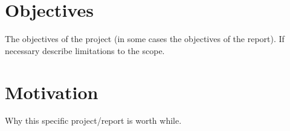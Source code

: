 
\section{Objectives}

The objectives of the project (in some cases the objectives of the report). If necessary describe limitations to the scope.

\section{Motivation}

Why this specific project/report is worth while.


